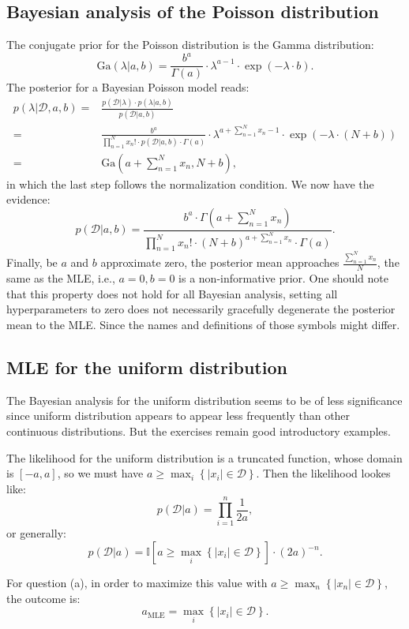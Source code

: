 \documentclass[UTF8]{ctexart}
\begin{document}
\subsection{Bayesian analysis of the Poisson distribution}
The conjugate prior for the Poisson distribution is the Gamma distribution:
$$\text{Ga}(\lambda|a,b)=\frac{b^{a}}{\Gamma(a)}\cdot\lambda^{a-1}\cdot\exp(-\lambda\cdot b).$$
The posterior for a Bayesian Poisson model reads:
$$
\begin{aligned}
p(\lambda|\mathcal{D},a,b)=& \frac{p(\mathcal{D}|\lambda)\cdot p(\lambda|a,b)}{p(\mathcal{D}|a,b)}\\
=& \frac{b^{a}}{\prod_{n=1}^{N}x_{n}!\cdot p(\mathcal{D}|a,b)\cdot\Gamma(a)}\cdot\lambda^{a+\sum_{n=1}^{N}x_{n}-1}\cdot\exp\left(-\lambda\cdot (N+b)\right) \\
 =& \text{Ga}(a+\sum_{n=1}^{N} x_{n}, N+b),
\end{aligned}
$$
in which the last step follows the normalization condition. 
We now have the evidence:
$$p(\mathcal{D}|a,b)=\frac{b^{a}\cdot\Gamma(a+\sum_{n=1}^{N}x_{n})}{\prod_{n=1}^{N}x_{n}!\cdot(N+b)^{a+\sum_{n=1}^{N}x_{n}}\cdot\Gamma(a)}.$$
Finally, be $a$ and $b$ approximate zero, the posterior mean approaches $\frac{\sum_{n=1}^{N}x_{n}}{N}$, the same as the MLE, i.e., $a=0,b=0$ is a non-informative prior. 
One should note that this property does not hold for all Bayesian analysis, setting all hyperparameters to zero does not necessarily gracefully degenerate the posterior mean to the MLE. 
Since the names and definitions of those symbols might differ. 

\subsection{MLE for the uniform distribution}
The Bayesian analysis for the uniform distribution seems to be of less significance since uniform distribution appears to appear less frequently than other continuous distributions. 
But the exercises remain good introductory examples. 

The likelihood for the uniform distribution is a truncated function, whose domain is $[-a,a]$, so we must have $a\geq \max_{i}\left\{ |x_{i}|\in\mathcal{D}\right\}$. 
Then the likelihood lookes like:
$$p(\mathcal{D}|a)=\prod_{i=1}^{n}\frac{1}{2a},$$
or generally:
$$p(\mathcal{D}|a)=\mathbb{I}[a\geq \max_{i}\left\{ |x_{i}|\in\mathcal{D}\right\}]\cdot (2a)^{-n}.$$

For question (a), in order to maximize this value with $a\geq \max_{n}\left\{ |x_{n}|\in\mathcal{D}\right\}$, the outcome is:
$$a_{\text{MLE}}=\max_{i}\left\{ |x_{i}|\in\mathcal{D}\right\}.$$
\end{document}

